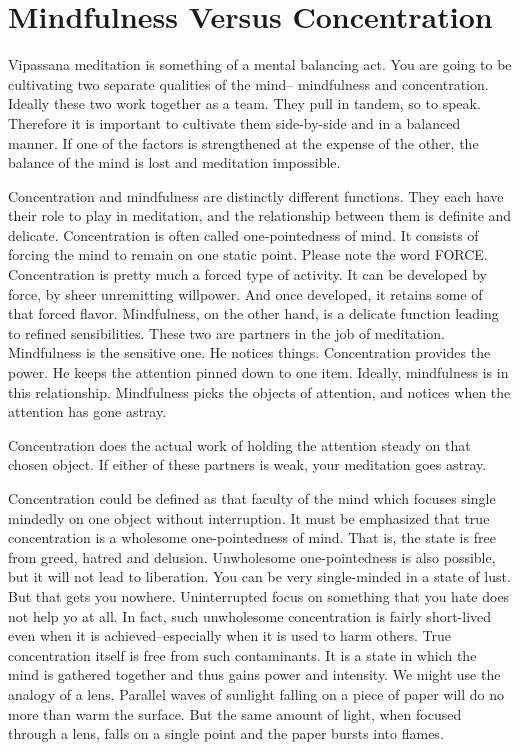 \chapter{Mindfulness Versus Concentration} 

Vipassana meditation is something of a mental balancing act. You are going to be
cultivating two separate qualities of the mind-- mindfulness and concentration.
Ideally these two work together as a team. They pull in tandem, so to speak.
Therefore it is important to cultivate them side-by-side and in a balanced
manner. If one of the factors is strengthened at the expense of the other, the
balance of the mind is lost and meditation impossible.

Concentration and mindfulness are distinctly different functions. They each have
their role to play in meditation, and the relationship between them is definite
and delicate. Concentration is often called one-pointedness of mind. It consists
of forcing the mind to remain on one static point. Please note the word FORCE.
Concentration is pretty much a forced type of activity. It can be developed by
force, by sheer unremitting willpower. And once developed, it retains some of
that forced flavor. Mindfulness, on the other hand, is a delicate function
leading to refined sensibilities. These two are partners in the job of
meditation. Mindfulness is the sensitive one. He notices things. Concentration
provides the power. He keeps the attention pinned down to one item. Ideally,
mindfulness is in this relationship. Mindfulness picks the objects of attention,
and notices when the attention has gone astray.

Concentration does the actual work of holding the attention steady on that
chosen object. If either of these partners is weak, your meditation goes astray.

Concentration could be defined as that faculty of the mind which focuses single
mindedly on one object without interruption. It must be emphasized that true
concentration is a wholesome one-pointedness of mind. That is, the state is free
from greed, hatred and delusion. Unwholesome one-pointedness is also possible,
but it will not lead to liberation. You can be very single-minded in a state of
lust. But that gets you nowhere. Uninterrupted focus on something that you hate
does not help yo at all. In fact, such unwholesome concentration is fairly
short-lived even when it is achieved--especially when it is used to harm others.
True concentration itself is free from such contaminants. It is a state in which
the mind is gathered together and thus gains power and intensity. We might use
the analogy of a lens. Parallel waves of sunlight falling on a piece of paper
will do no more than warm the surface. But the same amount of light, when
focused through a lens, falls on a single point and the paper bursts into
flames.


